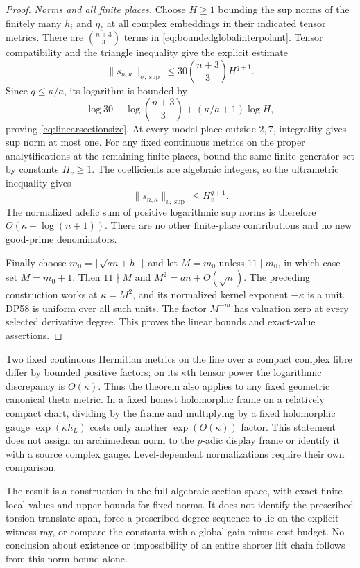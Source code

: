 \documentclass[11pt,a4paper]{article}
\theoremstyle{definition}\newtheorem{remark}[theorem]{Remark}
\begin{document}
\begin{proof}
\emph{Norms and all finite places.}
Choose $H\ge1$ bounding the sup norms of the finitely many $h_i$ and $\eta_\ell$ at all complex embeddings in their indicated tensor metrics.
There are $\binom{n+3}{3}$ terms in \eqref{eq:boundedglobalinterpolant}.
Tensor compatibility and the triangle inequality give the explicit estimate
\[
 \|s_{n,\kappa}\|_{\sigma,\sup}
 \le30\binom{n+3}{3}H^{q+1}.
\]
Since $q\le\kappa/a$, its logarithm is bounded by
\[
 \log30+\log\binom{n+3}{3}
       +(\kappa/a+1)\log H,
\]
proving \eqref{eq:linearsectionsize}.
At every model place outside $2,7$, integrality gives sup norm at most one.
For any fixed continuous metrics on the proper analytifications at the remaining finite places, bound the same finite generator set by constants $H_v\ge1$.
The coefficients are algebraic integers, so the ultrametric inequality gives
\[
 \|s_{n,\kappa}\|_{v,\sup}\le H_v^{q+1}.
\]
The normalized adelic sum of positive logarithmic sup norms is therefore $O(\kappa+\log(n+1))$.
There are no other finite-place contributions and no new good-prime denominators.

Finally choose $m_0=\lceil\sqrt{an+b_0}\rceil$ and let $M=m_0$ unless $11\mid m_0$, in which case set $M=m_0+1$.
Then $11\nmid M$ and $M^2=an+O(\sqrt n)$.
The preceding construction works at $\kappa=M^2$, and its normalized kernel exponent $-\kappa$ is a unit.
DP58 is uniform over all such units.
The factor $M^{-m}$ has valuation zero at every selected derivative degree.
This proves the linear bounds and exact-value assertions.
\end{proof}

Two fixed continuous Hermitian metrics on the line over a compact complex fibre differ by bounded positive factors; on its $\kappa$th tensor power the logarithmic discrepancy is $O(\kappa)$.
Thus the theorem also applies to any fixed geometric canonical theta metric.
In a fixed honest holomorphic frame on a relatively compact chart, dividing by the frame and multiplying by a fixed holomorphic gauge $\exp(\kappa h_L)$ costs only another $\exp(O(\kappa))$ factor.
This statement does not assign an archimedean norm to the $p$-adic display frame or identify it with a source complex gauge.
Level-dependent normalizations require their own comparison.

The result is a construction in the full algebraic section space, with exact finite local values and upper bounds for fixed norms.
It does not identify the prescribed torsion-translate span, force a prescribed degree sequence to lie on the explicit witness ray, or compare the constants with a global gain-minus-cost budget.
No conclusion about existence or impossibility of an entire shorter lift chain follows from this norm bound alone.
\end{document}

